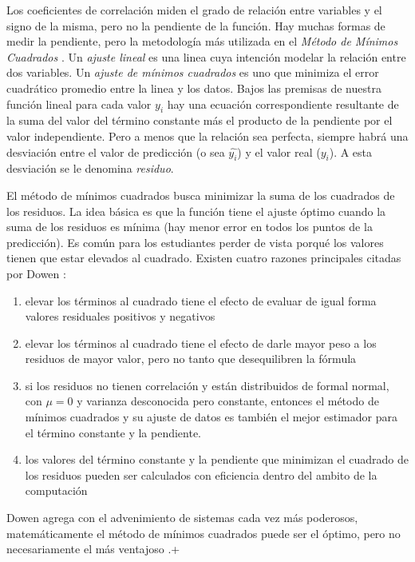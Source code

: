 \documentclass[letterpaper, spanish, 11pt]{report}
\begin{document}
Los coeficientes de correlación miden el grado de relación entre variables y el signo de la misma, pero no la pendiente de la función. Hay muchas formas de medir la pendiente, pero la metodología más utilizada en el \emph{Método de Mínimos Cuadrados} \cite{thinkStats}. Un \emph{ajuste lineal} es una linea cuya intención modelar la relación entre dos variables. Un \emph{ajuste de mínimos cuadrados} es uno que minimiza el error cuadrático promedio entre la linea y los datos. Bajos las premisas de nuestra función lineal para cada valor $y_{i}$ hay una ecuación correspondiente resultante de la suma del valor del término constante más el producto de la pendiente por el valor independiente. Pero a menos que la relación sea perfecta, siempre habrá una desviación entre el valor de predicción (o sea $\hat{y_{i}}$) y el valor real ($y_{i}$). A esta desviación se le denomina \emph{residuo}.

El método de mínimos cuadrados busca minimizar la suma de los cuadrados de los residuos. La idea básica es que la función tiene el ajuste óptimo cuando la suma de los residuos es mínima (hay menor error en todos los puntos de la predicción). Es común para los estudiantes perder de vista porqué los valores tienen que estar elevados al cuadrado. Existen cuatro razones principales citadas por Dowen \cite{thinkStats}:

\begin{enumerate}
	\item elevar los términos al cuadrado tiene el efecto de evaluar de igual forma valores residuales positivos y negativos
	\item elevar los términos al cuadrado tiene el efecto de darle mayor peso a los residuos de mayor valor, pero no tanto que desequilibren la fórmula
	\item si los residuos no tienen correlación y están distribuidos de formal normal, con $\mu = 0$ y varianza desconocida pero constante, entonces el método de mínimos cuadrados y su ajuste de datos es también el mejor estimador para el término constante y la pendiente.
	\item los valores del término constante y la pendiente que minimizan el cuadrado de los residuos pueden ser calculados con eficiencia dentro del ambito de la computación
\end{enumerate}

Dowen agrega con el advenimiento de sistemas cada vez más poderosos, matemáticamente el método de mínimos cuadrados puede ser el óptimo, pero no necesariamente el más ventajoso \cite{thinkStats}.+
\end{document}
